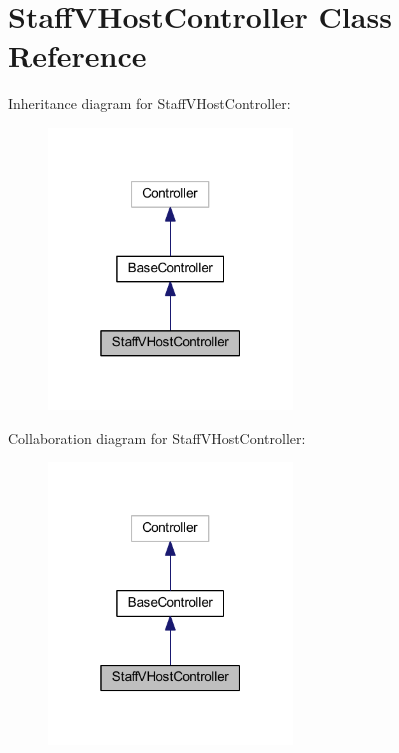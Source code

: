 \hypertarget{class_staff_v_host_controller}{}\section{Staff\+V\+Host\+Controller Class Reference}
\label{class_staff_v_host_controller}


Inheritance diagram for Staff\+V\+Host\+Controller\+:
\nopagebreak
\begin{figure}[H]
\begin{center}
\leavevmode
\includegraphics[width=184pt]{class_staff_v_host_controller__inherit__graph}
\end{center}
\end{figure}


Collaboration diagram for Staff\+V\+Host\+Controller\+:
\nopagebreak
\begin{figure}[H]
\begin{center}
\leavevmode
\includegraphics[width=184pt]{class_staff_v_host_controller__coll__graph}
\end{center}
\end{figure}
